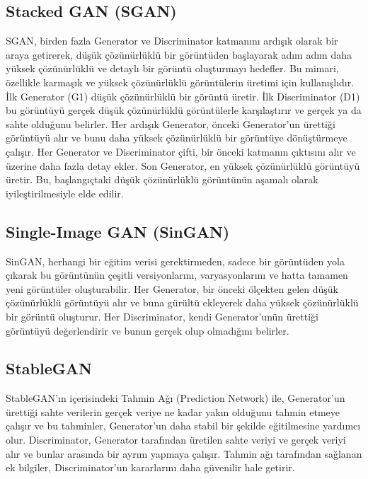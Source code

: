 \subsection{Stacked GAN (SGAN)}

SGAN, birden fazla Generator ve Discriminator katmanını ardışık olarak bir araya getirerek, düşük çözünürlüklü bir görüntüden başlayarak adım adım daha yüksek çözünürlüklü ve detaylı bir görüntü oluşturmayı hedefler. Bu mimari, özellikle karmaşık ve yüksek çözünürlüklü görüntülerin üretimi için kullanışlıdır. İlk Generator (G1) düşük çözünürlüklü bir görüntü üretir. İlk Discriminator (D1) bu görüntüyü gerçek düşük çözünürlüklü görüntülerle karşılaştırır ve gerçek ya da sahte olduğunu belirler. Her ardışık Generator, önceki Generator'un ürettiği görüntüyü alır ve bunu daha yüksek çözünürlüklü bir görüntüye dönüştürmeye çalışır. Her Generator ve Discriminator çifti, bir önceki katmanın çıktısını alır ve üzerine daha fazla detay ekler. Son Generator, en yüksek çözünürlüklü görüntüyü üretir. Bu, başlangıçtaki düşük çözünürlüklü görüntünün aşamalı olarak iyileştirilmesiyle elde edilir. 

\subsection{Single-Image GAN (SinGAN)}

SinGAN, herhangi bir eğitim verisi gerektirmeden, sadece bir görüntüden yola çıkarak bu görüntünün çeşitli versiyonlarını, varyasyonlarını ve hatta tamamen yeni görüntüler oluşturabilir. Her Generator, bir önceki ölçekten gelen düşük çözünürlüklü görüntüyü alır ve buna gürültü ekleyerek daha yüksek çözünürlüklü bir görüntü oluşturur. Her Discriminator, kendi Generator'unün ürettiği görüntüyü değerlendirir ve bunun gerçek olup olmadığını belirler.

\subsection{StableGAN}

StableGAN'ın içerisindeki Tahmin Ağı (Prediction Network) ile, Generator'un ürettiği sahte verilerin gerçek veriye ne kadar yakın olduğunu tahmin etmeye çalışır ve bu tahminler, Generator'un daha stabil bir şekilde eğitilmesine yardımcı olur. Discriminator, Generator tarafından üretilen sahte veriyi ve gerçek veriyi alır ve bunlar arasında bir ayrım yapmaya çalışır. Tahmin ağı tarafından sağlanan ek bilgiler, Discriminator'un kararlarını daha güvenilir hale getirir.

